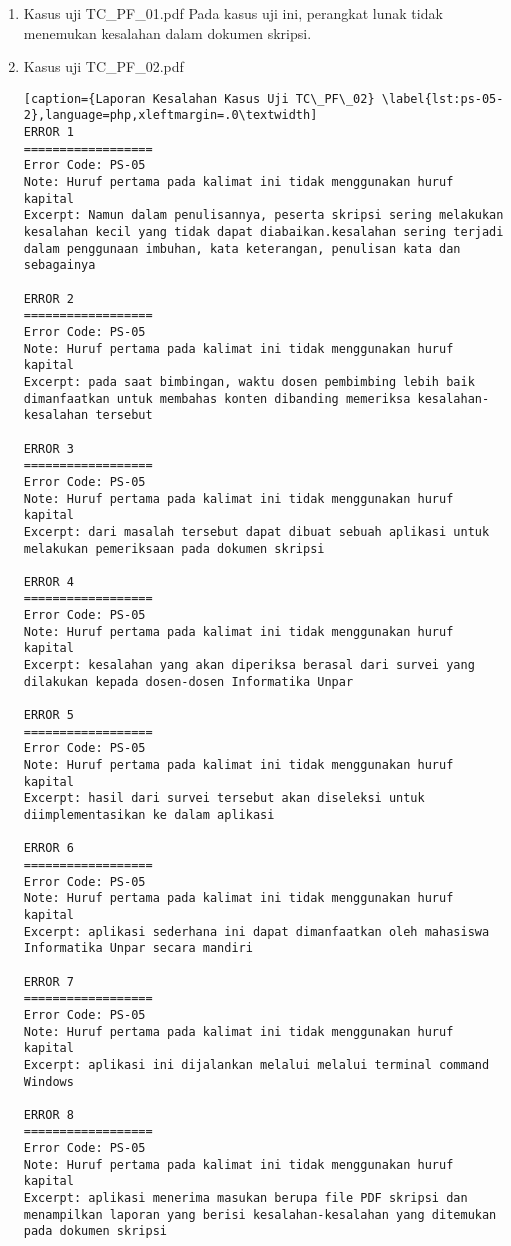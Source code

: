 \begin{enumerate}
	\item Kasus uji TC\_PF\_01.pdf
	Pada kasus uji ini, perangkat lunak tidak menemukan kesalahan dalam dokumen skripsi.
	
	\item Kasus uji TC\_PF\_02.pdf
	
\begin{lstlisting}[caption={Laporan Kesalahan Kasus Uji TC\_PF\_02}	\label{lst:ps-05-2},language=php,xleftmargin=.0\textwidth]
ERROR 1
==================
Error Code: PS-05
Note: Huruf pertama pada kalimat ini tidak menggunakan huruf kapital
Excerpt: Namun dalam penulisannya, peserta skripsi sering melakukan kesalahan kecil yang tidak dapat diabaikan.kesalahan sering terjadi dalam penggunaan imbuhan, kata keterangan, penulisan kata dan sebagainya

ERROR 2
==================
Error Code: PS-05
Note: Huruf pertama pada kalimat ini tidak menggunakan huruf kapital
Excerpt: pada saat bimbingan, waktu dosen pembimbing lebih baik dimanfaatkan untuk membahas konten dibanding memeriksa kesalahan-kesalahan tersebut

ERROR 3
==================
Error Code: PS-05
Note: Huruf pertama pada kalimat ini tidak menggunakan huruf kapital
Excerpt: dari masalah tersebut dapat dibuat sebuah aplikasi untuk melakukan pemeriksaan pada dokumen skripsi

ERROR 4
==================
Error Code: PS-05
Note: Huruf pertama pada kalimat ini tidak menggunakan huruf kapital
Excerpt: kesalahan yang akan diperiksa berasal dari survei yang dilakukan kepada dosen-dosen Informatika Unpar

ERROR 5
==================
Error Code: PS-05
Note: Huruf pertama pada kalimat ini tidak menggunakan huruf kapital
Excerpt: hasil dari survei tersebut akan diseleksi untuk diimplementasikan ke dalam aplikasi

ERROR 6
==================
Error Code: PS-05
Note: Huruf pertama pada kalimat ini tidak menggunakan huruf kapital
Excerpt: aplikasi sederhana ini dapat dimanfaatkan oleh mahasiswa Informatika Unpar secara mandiri

ERROR 7
==================
Error Code: PS-05
Note: Huruf pertama pada kalimat ini tidak menggunakan huruf kapital
Excerpt: aplikasi ini dijalankan melalui melalui terminal command Windows 

ERROR 8
==================
Error Code: PS-05
Note: Huruf pertama pada kalimat ini tidak menggunakan huruf kapital
Excerpt: aplikasi menerima masukan berupa file PDF skripsi dan menampilkan laporan yang berisi kesalahan-kesalahan yang ditemukan pada dokumen skripsi
\end{lstlisting}
\end{enumerate}

